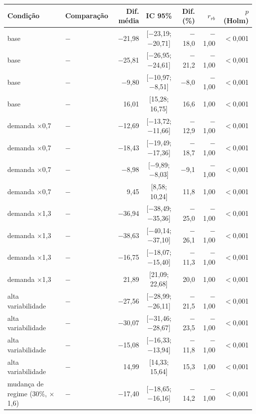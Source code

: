 \begin{tabular}{@{}llrcrrr@{}}
\toprule
Condição & Comparação & Dif. média & IC 95\% & Dif. (\%) & $r_{rb}$ & $p$ (Holm) \\
\midrule
base & \polBOR{} $-$ \polA{} & $-$21,98 & [$-$23,19; $-$20,71] & $-$18,0 & $-$1,00 & $<$0,001 \\
base & \polC{} $-$ \polA{} & $-$25,81 & [$-$26,95; $-$24,61] & $-$21,2 & $-$1,00 & $<$0,001 \\
base & \polD{} $-$ \polA{} & $-$9,80 & [$-$10,97; $-$8,51] & $-$8,0 & $-$1,00 & $<$0,001 \\
base & \polD{} $-$ \polC{} & 16,01 & [15,28; 16,75] & 16,6 & 1,00 & $<$0,001 \\
demanda $\times$0,7 & \polBOR{} $-$ \polA{} & $-$12,69 & [$-$13,72; $-$11,66] & $-$12,9 & $-$1,00 & $<$0,001 \\
demanda $\times$0,7 & \polC{} $-$ \polA{} & $-$18,43 & [$-$19,49; $-$17,36] & $-$18,7 & $-$1,00 & $<$0,001 \\
demanda $\times$0,7 & \polD{} $-$ \polA{} & $-$8,98 & [$-$9,89; $-$8,03] & $-$9,1 & $-$1,00 & $<$0,001 \\
demanda $\times$0,7 & \polD{} $-$ \polC{} & 9,45 & [8,58; 10,24] & 11,8 & 1,00 & $<$0,001 \\
demanda $\times$1,3 & \polBOR{} $-$ \polA{} & $-$36,94 & [$-$38,49; $-$35,36] & $-$25,0 & $-$1,00 & $<$0,001 \\
demanda $\times$1,3 & \polC{} $-$ \polA{} & $-$38,63 & [$-$40,14; $-$37,10] & $-$26,1 & $-$1,00 & $<$0,001 \\
demanda $\times$1,3 & \polD{} $-$ \polA{} & $-$16,75 & [$-$18,07; $-$15,40] & $-$11,3 & $-$1,00 & $<$0,001 \\
demanda $\times$1,3 & \polD{} $-$ \polC{} & 21,89 & [21,09; 22,68] & 20,0 & 1,00 & $<$0,001 \\
alta variabilidade & \polBOR{} $-$ \polA{} & $-$27,56 & [$-$28,99; $-$26,11] & $-$21,5 & $-$1,00 & $<$0,001 \\
alta variabilidade & \polC{} $-$ \polA{} & $-$30,07 & [$-$31,46; $-$28,67] & $-$23,5 & $-$1,00 & $<$0,001 \\
alta variabilidade & \polD{} $-$ \polA{} & $-$15,08 & [$-$16,33; $-$13,94] & $-$11,8 & $-$1,00 & $<$0,001 \\
alta variabilidade & \polD{} $-$ \polC{} & 14,99 & [14,33; 15,64] & 15,3 & 1,00 & $<$0,001 \\
mudança de regime (30\%, $\times$1,6) & \polBOR{} $-$ \polA{} & $-$17,40 & [$-$18,65; $-$16,16] & $-$14,2 & $-$1,00 & $<$0,001 \\

\end{tabular}
